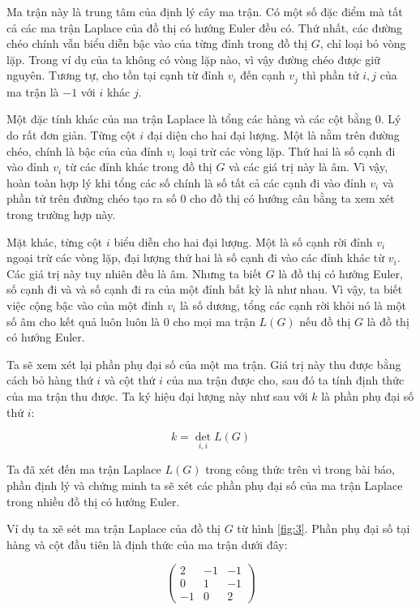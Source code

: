 \documentclass[14pt, a4paper]{article}
\numberwithin{equation}{section}
\numberwithin{figure}{section}
\numberwithin{dl}{section}
\numberwithin{md}{section}
\numberwithin{bd}{section}
\numberwithin{dn}{section}
\numberwithin{hq}{section}
\begin{document}
    Ma trận này là trung tâm của định lý cây ma trận.
    Có một số đặc điểm mà tất cả các ma trận Laplace của đồ thị có hướng Euler đều có.
    Thứ nhất, các đường chéo chính vẫn biểu diễn bậc vào của từng đỉnh trong đồ thị $G$, chỉ loại bỏ vòng lặp.
    Trong ví dụ của ta không có vòng lặp nào, vì vậy đường chéo được giữ nguyên.
    Tương tự, cho tồn tại cạnh từ đỉnh $v_i$ đến cạnh $v_j$ thì phần tử $i, j$ của ma trận là $-1$ với $i$ khác $j$.

    Một đặc tính khác của ma trận Laplace là tổng các hàng và các cột bằng 0.
    Lý do rất đơn giản. Từng cột $i$ đại diện cho hai đại lượng. Một là nằm trên đường chéo, chính là bậc của của đỉnh $v_i$ loại trừ các vòng lặp.
    Thứ hai là số cạnh đi vào đỉnh $v_i$ từ các đỉnh khác trong đồ thị $G$ và các giá trị này là âm. 
    Vì vậy, hoàn toàn hợp lý khi tổng các số chính là số tất cả các cạnh đi vào đỉnh $v_i$ và phần tử trên đường chéo tạo ra số 0 cho đồ thị có hướng cân bằng ta xem xét trong trường hợp này.

    Mặt khác, từng cột $i$ biểu diễn cho hai đại lượng.
    Một là số cạnh rời đỉnh $v_i$ ngoại trừ các vòng lặp, đại lượng thứ hai là số cạnh đi vào các đỉnh khác từ $v_i$.
    Các giá trị này tuy nhiên đều là âm.
    Nhưng ta biết $G$ là đồ thị có hướng Euler, số cạnh đi và và số cạnh đi ra của một đỉnh bất kỳ là như nhau.
    Vì vậy, ta biết việc cộng bậc vào của một đỉnh $v_i$ là số dương, tổng các cạnh rời khỏi nó là một số âm cho kết quả luôn luôn là 0 cho mọi ma trận $L(G)$ nếu đồ thị $G$ là đồ thị có hướng Euler.

    Ta sẽ xem xét lại phần phụ đại số của một ma trận.
    Giá trị này thu được bằng cách bỏ hàng thứ $i$ và cột thứ $i$ của ma trận được cho, sau đó ta tính định thức của ma trận thu được.
    Ta ký hiệu đại lượng này như sau với $k$ là phần phụ đại số thứ $i$:

    \begin{equation}
        k = \det_{i, i} L(G)
    \end{equation}

    Ta đã xét đến ma trận Laplace $L(G)$ trong công thức trên vì trong bài báo, phần định lý và chứng minh ta sẽ xét các phần phụ đại số của ma trận Laplace trong nhiều đồ thị có hướng Euler.

    Ví dụ ta xẽ sét ma trận Laplace của đồ thị $G$ từ hình \ref{fig:3}.
    Phần phụ đại số tại hàng và cột đầu tiên là định thức của ma trận dưới đây:


    \begin{equation*}
        \begin{pmatrix}
            2 & -1 & -1 \\
            0 & 1 & -1 \\
            -1 & 0 & 2
        \end{pmatrix}
    \end{equation*}
\end{document}
